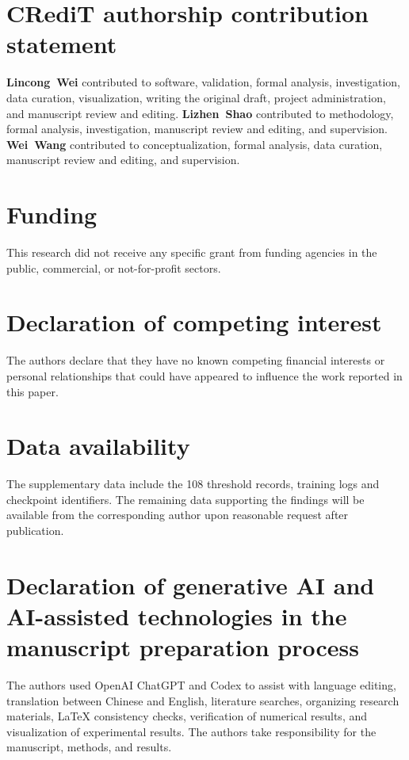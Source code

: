 \documentclass[final,5p,times,twocolumn]{elsarticle}
\begin{document}


\section*{CRediT authorship contribution statement}
\textbf{Lincong~Wei} contributed to software, validation, formal analysis, investigation, data curation, visualization, writing the original draft, project administration, and manuscript review and editing.
\textbf{Lizhen~Shao} contributed to methodology, formal analysis, investigation, manuscript review and editing, and supervision.
\textbf{Wei~Wang} contributed to conceptualization, formal analysis, data curation, manuscript review and editing, and supervision.

\section*{Funding}
This research did not receive any specific grant from funding agencies in the public, commercial, or not-for-profit sectors.

\section*{Declaration of competing interest}
The authors declare that they have no known competing financial interests or personal relationships that could have appeared to influence the work reported in this paper.

\section*{Data availability}
The supplementary data include the 108 threshold records, training logs and checkpoint identifiers. The remaining data supporting the findings will be available from the corresponding author upon reasonable request after publication.

\section*{Declaration of generative AI and AI-assisted technologies in the manuscript preparation process}
The authors used OpenAI ChatGPT and Codex to assist with language editing, translation between Chinese and English, literature searches, organizing research materials, \LaTeX{} consistency checks, verification of numerical results, and visualization of experimental results. The authors take responsibility for the manuscript, methods, and results.

\FloatBarrier
\small
\setlength{\bibsep}{0pt}

\end{document}
